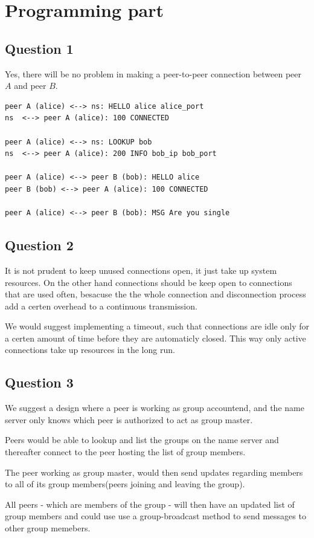 \section{Programming part}
\subsection{Question 1}
Yes, there will be no problem in making a peer-to-peer connection between
peer $A$ and peer $B$.

\begin{lstlisting}
peer A (alice) <--> ns: HELLO alice alice_port
ns  <--> peer A (alice): 100 CONNECTED

peer A (alice) <--> ns: LOOKUP bob
ns  <--> peer A (alice): 200 INFO bob_ip bob_port

peer A (alice) <--> peer B (bob): HELLO alice
peer B (bob) <--> peer A (alice): 100 CONNECTED

peer A (alice) <--> peer B (bob): MSG Are you single
\end{lstlisting}

\subsection{Question 2}
It is not prudent to keep unused connections open, it just take up system
resources. On the other hand connections should be keep open to connections
that are used often, besacuse the the whole connection and disconnection
process add a certen overhead to a continuous transmission.

We would suggest implementing a timeout, such that connections are idle only
for a certen amount of time before they are automaticly closed. This way only
active connections take up resources in the long run.


\subsection{Question 3}
We suggest a design where a peer is working as group accountend, and the name
server only knows which peer is authorized to act as group master.

Peers would be able to lookup and list the groups on the name server and
thereafter connect to the peer hosting the list of group members.

The peer working as group master, would then send updates regarding members to
all of its group members(peers joining and leaving the group).

All peers - which are members of the group - will then have an updated list of
group members and could use use a group-broadcast method to send messages to
other group memebers.

